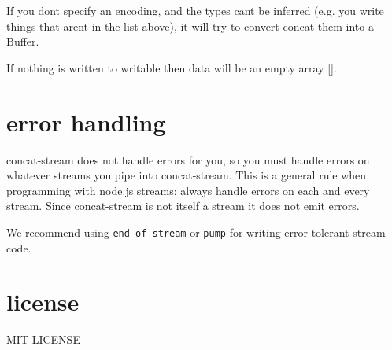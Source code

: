 If you don\textquotesingle{}t specify an encoding, and the types can\textquotesingle{}t be inferred (e.\+g. you write things that aren\textquotesingle{}t in the list above), it will try to convert concat them into a {\ttfamily Buffer}.

If nothing is written to {\ttfamily writable} then {\ttfamily data} will be an empty array {\ttfamily \mbox{[}\mbox{]}}.

\section*{error handling}

{\ttfamily concat-\/stream} does not handle errors for you, so you must handle errors on whatever streams you pipe into {\ttfamily concat-\/stream}. This is a general rule when programming with node.\+js streams\+: always handle errors on each and every stream. Since {\ttfamily concat-\/stream} is not itself a stream it does not emit errors.

We recommend using \href{https://npmjs.org/end-of-stream}{\tt {\ttfamily end-\/of-\/stream}} or \href{https://npmjs.org/pump}{\tt {\ttfamily pump}} for writing error tolerant stream code.

\section*{license}

M\+IT L\+I\+C\+E\+N\+SE 